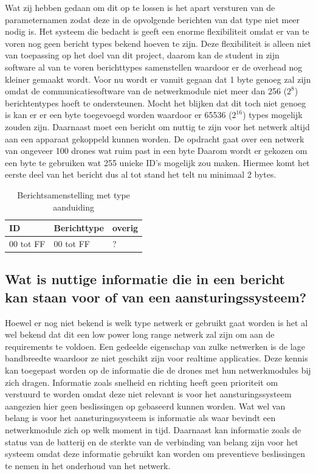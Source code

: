 \documentclass[a4paper, 11pt, oneside]{report}
\begin{document}
Wat zij hebben gedaan om dit op te lossen is het apart versturen van de parameternamen zodat deze in de opvolgende berichten van dat type niet meer nodig is.
Het systeem die bedacht is geeft een enorme flexibiliteit omdat er van te voren nog geen bericht types bekend hoeven te zijn.
Deze flexibiliteit is alleen niet van toepassing op het doel van dit project, daarom kan de student in zijn software al van te voren berichttypes samenstellen waardoor er de overhead nog kleiner gemaakt wordt.
Voor nu wordt er vanuit gegaan dat 1 byte genoeg zal zijn omdat de communicatiesoftware van de netwerkmodule niet meer dan 256 ($2^{8}$) berichtentypes hoeft te ondersteunen.
Mocht het blijken dat dit toch niet genoeg is kan er er een byte toegevoegd worden waardoor er 65536 ($2^{16}$) types mogelijk zouden zijn.
Daarnaast moet een bericht om nuttig te zijn voor het netwerk altijd aan een apparaat gekoppeld kunnen worden.
De opdracht gaat over een netwerk van ongeveer 100 drones wat ruim past in een byte
Daarom wordt er gekozen om een byte te gebruiken wat 255 unieke ID's mogelijk zou maken. 
Hiermee komt het eerste deel van het bericht dus al tot stand het telt nu minimaal 2 bytes.

\begin{table}[H]
	\centering
	\begin{tabular}{|l|l|l|}
		\hline
		\rowcolor[HTML]{C0C0C0} 
		ID & Berichttype & overig \\ \hline
		00 tot FF   & 00 tot FF       & ?      \\ \hline
	\end{tabular}
	\caption{Berichtsamenstelling met type aanduiding}
	\label{tab:serialstart}
\end{table}

\subsection{Wat is nuttige informatie die in een bericht kan staan voor of van een aansturingssysteem?}
\label{sub:watisnuttigeinformatie}
Hoewel er nog niet bekend is welk type netwerk er gebruikt gaat worden is het al wel bekend dat dit een low power long range netwerk zal zijn om aan de requirements te voldoen.
Een gedeelde eigenschap van zulke netwerken is de lage bandbreedte waardoor ze niet geschikt zijn voor realtime applicaties.
Deze kennis kan toegepast worden op de informatie die de drones met hun netwerkmodules bij zich dragen. 
Informatie zoals snelheid en richting heeft geen prioriteit om verstuurd te worden omdat deze niet relevant is voor het aansturingssysteem aangezien hier geen beslissingen op gebaseerd kunnen worden.
Wat wel van belang is voor het aansturingssysteem is informatie als waar bevindt een netwerkmodule zich op welk moment in tijd.
Daarnaast kan informatie zoals de status van de batterij en de sterkte van de verbinding van belang zijn voor het systeem omdat deze informatie gebruikt kan worden om preventieve beslissingen te nemen in het onderhoud van het netwerk.
\end{document}
